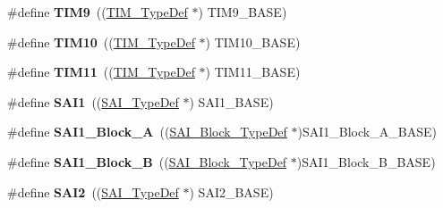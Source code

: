 \begin{DoxyCompactItemize}
\item 
\#define {\bfseries T\+I\+M9}~((\hyperlink{struct_t_i_m___type_def}{T\+I\+M\+\_\+\+Type\+Def} $\ast$) T\+I\+M9\+\_\+\+B\+A\+SE)\hypertarget{group___peripheral__declaration_gaf52b4b4c36110a0addfa98059f54a50e}{}\label{group___peripheral__declaration_gaf52b4b4c36110a0addfa98059f54a50e}

\item 
\#define {\bfseries T\+I\+M10}~((\hyperlink{struct_t_i_m___type_def}{T\+I\+M\+\_\+\+Type\+Def} $\ast$) T\+I\+M10\+\_\+\+B\+A\+SE)\hypertarget{group___peripheral__declaration_ga46b2ad3f5f506f0f8df0d2ec3e767267}{}\label{group___peripheral__declaration_ga46b2ad3f5f506f0f8df0d2ec3e767267}

\item 
\#define {\bfseries T\+I\+M11}~((\hyperlink{struct_t_i_m___type_def}{T\+I\+M\+\_\+\+Type\+Def} $\ast$) T\+I\+M11\+\_\+\+B\+A\+SE)\hypertarget{group___peripheral__declaration_gacfd11ef966c7165f57e2cebe0abc71ad}{}\label{group___peripheral__declaration_gacfd11ef966c7165f57e2cebe0abc71ad}

\item 
\#define {\bfseries S\+A\+I1}~((\hyperlink{struct_s_a_i___type_def}{S\+A\+I\+\_\+\+Type\+Def} $\ast$) S\+A\+I1\+\_\+\+B\+A\+SE)\hypertarget{group___peripheral__declaration_gaa878b214698fcf74a3268d07562abbb2}{}\label{group___peripheral__declaration_gaa878b214698fcf74a3268d07562abbb2}

\item 
\#define {\bfseries S\+A\+I1\+\_\+\+Block\+\_\+A}~((\hyperlink{struct_s_a_i___block___type_def}{S\+A\+I\+\_\+\+Block\+\_\+\+Type\+Def} $\ast$)S\+A\+I1\+\_\+\+Block\+\_\+\+A\+\_\+\+B\+A\+SE)\hypertarget{group___peripheral__declaration_gaa29e42155e075c03d156d759b4e69c5c}{}\label{group___peripheral__declaration_gaa29e42155e075c03d156d759b4e69c5c}

\item 
\#define {\bfseries S\+A\+I1\+\_\+\+Block\+\_\+B}~((\hyperlink{struct_s_a_i___block___type_def}{S\+A\+I\+\_\+\+Block\+\_\+\+Type\+Def} $\ast$)S\+A\+I1\+\_\+\+Block\+\_\+\+B\+\_\+\+B\+A\+SE)\hypertarget{group___peripheral__declaration_gaaa4ab9bf6de588a9309acd4bf007c4e0}{}\label{group___peripheral__declaration_gaaa4ab9bf6de588a9309acd4bf007c4e0}

\item 
\#define {\bfseries S\+A\+I2}~((\hyperlink{struct_s_a_i___type_def}{S\+A\+I\+\_\+\+Type\+Def} $\ast$) S\+A\+I2\+\_\+\+B\+A\+SE)\hypertarget{group___peripheral__declaration_gac248a1f09e97346a66175a54ca7f9062}{}\label{group___peripheral__declaration_gac248a1f09e97346a66175a54ca7f9062}


\end{DoxyCompactItemize}
